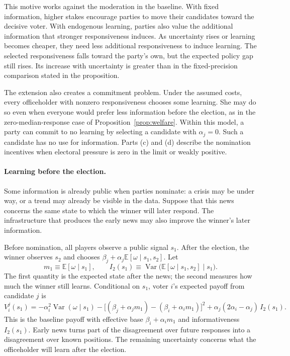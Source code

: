 \documentclass[12pt,letterpaper]{article}
\begin{document}
This motive works against the moderation in the baseline. With fixed information, higher stakes encourage parties to move their candidates toward the decisive voter. With endogenous learning, parties also value the additional information that stronger responsiveness induces. As uncertainty rises or learning becomes cheaper, they need less additional responsiveness to induce learning. The selected responsiveness falls toward the party's own, but the expected policy gap still rises. Its increase with uncertainty is greater than in the fixed-precision comparison stated in the proposition.

The extension also creates a commitment problem. Under the assumed costs, every officeholder with nonzero responsiveness chooses some learning. She may do so even when everyone would prefer less information before the election, as in the zero-median-response case of Proposition~\ref{prop:welfare}. Within this model, a party can commit to no learning by selecting a candidate with $\alpha_j=0$. Such a candidate has no use for information. Parts (c) and (d) describe the nomination incentives when electoral pressure is zero in the limit or weakly positive.

\paragraph{Learning before the election.}
Some information is already public when parties nominate: a crisis may be under way, or a trend may already be visible in the data. Suppose that this news concerns the same state to which the winner will later respond. The infrastructure that produces the early news may also improve the winner's later information.

Before nomination, all players observe a public signal $s_1$. After the election, the winner observes $s_2$ and chooses $\beta_j+\alpha_j\mathbb{E}[\omega\mid s_1,s_2]$. Let
\[
m_1\equiv\mathbb{E}[\omega\mid s_1],
\qquad
I_2(s_1)\equiv\operatorname{Var}\big(\mathbb{E}[\omega\mid s_1,s_2]\mid s_1\big).
\]
The first quantity is the expected state after the news; the second measures how much the winner still learns. Conditional on $s_1$, voter $i$'s expected payoff from candidate $j$ is
\[
V_i^j(s_1)=-\alpha_i^2\operatorname{Var}(\omega\mid s_1)-\big[(\beta_j+\alpha_jm_1)-(\beta_i+\alpha_im_1)\big]^2+\alpha_j(2\alpha_i-\alpha_j)\,I_2(s_1).
\]
This is the baseline payoff with effective base $\beta_i+\alpha_im_1$ and informativeness $I_2(s_1)$. Early news turns part of the disagreement over future responses into a disagreement over known positions. The remaining uncertainty concerns what the officeholder will learn after the election.
\end{document}
